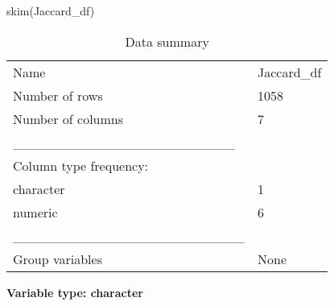 \documentclass[
  letterpaper,
  DIV=11,
  numbers=noendperiod]{scrreprt}
\newenvironment{Shaded}{\begin{snugshade}}{\end{snugshade}}
\newcommand{\FunctionTok}[1]{\textcolor[rgb]{0.28,0.35,0.67}{#1}}
\newcommand{\NormalTok}[1]{\textcolor[rgb]{0.00,0.23,0.31}{#1}}
\begin{document}
\begin{Shaded}
\begin{Highlighting}[]
\FunctionTok{skim}\NormalTok{(Jaccard\_df)}
\end{Highlighting}
\end{Shaded}

\begin{longtable}[]{@{}ll@{}}
\caption{Data summary}\tabularnewline
\toprule\noalign{}
\endfirsthead
\endhead
\bottomrule\noalign{}
\endlastfoot
Name & Jaccard\_df \\
Number of rows & 1058 \\
Number of columns & 7 \\
\_\_\_\_\_\_\_\_\_\_\_\_\_\_\_\_\_\_\_\_\_\_\_ & \\
Column type frequency: & \\
character & 1 \\
numeric & 6 \\
\_\_\_\_\_\_\_\_\_\_\_\_\_\_\_\_\_\_\_\_\_\_\_\_ & \\
Group variables & None \\
\end{longtable}

\textbf{Variable type: character}
\end{document}

